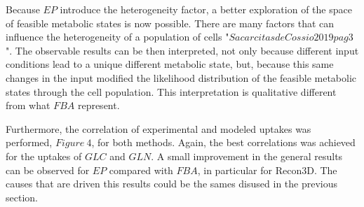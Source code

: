   	Because $EP$ introduce the heterogeneity factor, a better exploration of the space of feasible metabolic states is now possible. There are many factors that can influence the heterogeneity of a population of cells "$Sacar citas de Cossio2019 pag 3$". The observable results can be then interpreted, not only because different input conditions lead to a unique different metabolic state, but, because this same changes in the input modified the likelihood distribution of the feasible metabolic states through the cell population. This interpretation is qualitative different from what $FBA$ represent.
  	
  	Furthermore, the correlation of experimental and modeled uptakes was performed, $Figure\ 4$, for both methods. Again, the best correlations was achieved for the uptakes of $GLC$ and $GLN$. A small improvement in the general results can be observed for $EP$ compared with $FBA$, in particular for Recon3D. The causes that are driven this results could be the sames disused in the previous section. 